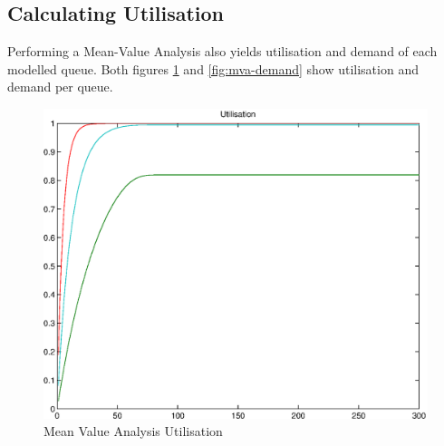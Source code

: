 \documentclass[a4paper]{article}
\begin{document}
\subsection{Calculating Utilisation}

Performing a Mean-Value Analysis also yields utilisation and demand of each modelled queue. Both figures \ref{fig:mva-utilisation} and \ref{fig:mva-demand} show utilisation and demand per queue.


\begin{figure}[H]
	\begin{center}
    \includegraphics[scale=0.6]{../plots-ms2-mg/mva-utilisation.eps}
  \end{center}
  \caption{Mean Value Analysis Utilisation}
  \label{fig:mva-utilisation}
\end{figure}



\end{document}
